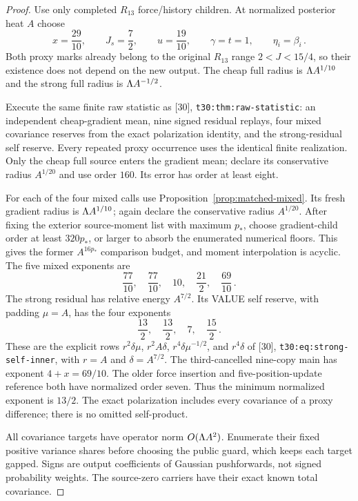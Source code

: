 \documentclass[11pt]{article}
\numberwithin{equation}{section}
\theoremstyle{remark}\newtheorem{remark}[theorem]{Remark}
\newcommand{\src}[1]{\texttt{\nolinkurl{#1}}}
\begin{document}
\begin{proof}
Use only completed $R_{13}$ force/history children. At normalized
posterior heat $A$ choose
\begin{equation}\label{eq:raw-seven-parameters}
 x=\frac{29}{10},\qquad J_s=\frac72,\qquad
 u=\frac{19}{10},\qquad \gamma=t=1,\qquad
 \eta_i=\beta_i\,.
\end{equation}
Both proxy marks already belong to the original $R_{13}$ range
$2<J<15/4$, so their existence does not depend on the new output.
The cheap full radius is $\Lambda A^{1/10}$ and the strong full
radius is $\Lambda A^{-1/2}$.

Execute the same finite raw statistic as [30],
\src{t30:thm:raw-statistic}: an independent cheap-gradient mean,
nine signed residual replays, four mixed covariance reserves from
the exact polarization identity, and the strong-residual self reserve.
Every repeated proxy occurrence uses the identical finite realization.
Only the cheap full source enters the gradient mean; declare its
conservative radius $A^{1/20}$ and use order $160$.
Its error has order at least eight.

For each of the four mixed calls use
Proposition~\ref{prop:matched-mixed}. Its fresh gradient radius is
$\Lambda A^{1/10}$; again declare the conservative radius $A^{1/20}$.
After fixing the exterior source-moment list with maximum $p_*$,
choose gradient-child order at least $320p_*$, or larger to absorb
the enumerated numerical floors. This gives the former
$A^{16p_*}$ comparison budget, and moment interpolation is acyclic.
The five mixed exponents are
\[
 \frac{77}{10},\quad\frac{77}{10},\quad10,\quad
 \frac{21}{2},\quad\frac{69}{10}\,.
\]
The strong residual has relative energy $A^{7/2}$. Its VALUE self
reserve, with padding $\mu=A$, has the four exponents
\[
 \frac{13}{2},\quad\frac{13}{2},\quad7,\quad\frac{15}{2}\,.
\]
These are the explicit rows
$r^2\delta\mu$, $r^2A\delta$, $r^4\delta\mu^{-1/2}$,
and $r^4\delta$ of [30], \src{t30:eq:strong-self-inner},
with $r=A$ and $\delta=A^{7/2}$.
The third-cancelled nine-copy main has exponent $4+x=69/10$.
The older force insertion and five-position-update reference both
have normalized order seven. Thus the minimum normalized exponent
is $13/2$. The exact polarization includes every covariance of a
proxy difference; there is no omitted self-product.

All covariance targets have operator norm $O(\Lambda A^2)$. Enumerate
their fixed positive variance shares before choosing the public
guard, which keeps each target gapped. Signs are output coefficients
of Gaussian pushforwards, not signed probability weights. The
source-zero carriers have their exact known total covariance.


\end{proof}
\end{document}
